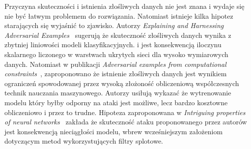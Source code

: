\documentclass[
    left=2.5cm,         %
    right=2.5cm,        %
    top=2.5cm,          %
    bottom=3cm,         %
    bindingoffset=6mm,  %
    nohyphenation=false %
]{eiti/eiti-thesis}
\begin{document}
Przyczyna skuteczności i istnienia złośliwych danych nie jest znana i wydaje się nie być łatwym problemem do rozwiązania.
Natomiast istnieje kilka hipotez starających się wyjaśnić to zjawisko.
Autorzy \textit{Explaining and Harnessing Adversarial Examples}~\cite{harnessing} sugerują że skuteczność złośliwych danych wynika z zbytniej liniowości modeli klasyfikacyjnych.
i jest konsekwencją iloczynu skalarnego liczonego w warstwach ukrytych sieci dla wysoko wymiarowych danych.
Natomiast w publikacji \textit{Adversarial examples from computational constraints}~\cite{Bubeck2019AdversarialEF},
zaproponowano że istnienie złośliwych danych jest wynikiem ograniczeń spowodowanej przez wysoką złożoność obliczeniową współczesnych technik nauczania maszynowego.
Autorzy usiłują wykazać że wytrenowanie modelu który byłby odporny na ataki jest możliwe, lecz bardzo kosztowne obliczeniowo i przez to trudne.
Hipoteza zaproponowana w \textit{Intriguing properties of neural networks}~\cite{DBLP:journals/corr/SzegedyZSBEGF13} zakłada
że skuteczność ataku proponowanego przez autorów jest konsekwencją nieciągłości modelu, wbrew wcześniejszym założeniom dotyczącym metod wykorzystujących filtry splotowe.

\newpage
\end{document}
